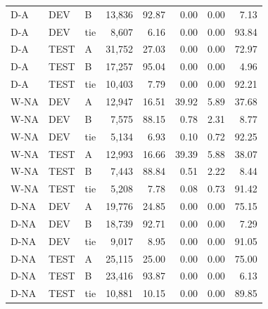 \begin{table}[htbp]
\begin{tabular}{lllrrrrr}
D-A & DEV & B & 13,836 & 92.87 & 0.00 & 0.00 & 7.13\\
D-A & DEV & tie & 8,607 & 6.16 & 0.00 & 0.00 & 93.84\\
D-A & TEST & A & 31,752 & 27.03 & 0.00 & 0.00 & 72.97\\
D-A & TEST & B & 17,257 & 95.04 & 0.00 & 0.00 & 4.96\\
D-A & TEST & tie & 10,403 & 7.79 & 0.00 & 0.00 & 92.21\\
W-NA & DEV & A & 12,947 & 16.51 & 39.92 & 5.89 & 37.68\\
W-NA & DEV & B & 7,575 & 88.15 & 0.78 & 2.31 & 8.77\\
W-NA & DEV & tie & 5,134 & 6.93 & 0.10 & 0.72 & 92.25\\
W-NA & TEST & A & 12,993 & 16.66 & 39.39 & 5.88 & 38.07\\
W-NA & TEST & B & 7,443 & 88.84 & 0.51 & 2.22 & 8.44\\
W-NA & TEST & tie & 5,208 & 7.78 & 0.08 & 0.73 & 91.42\\
D-NA & DEV & A & 19,776 & 24.85 & 0.00 & 0.00 & 75.15\\
D-NA & DEV & B & 18,739 & 92.71 & 0.00 & 0.00 & 7.29\\
D-NA & DEV & tie & 9,017 & 8.95 & 0.00 & 0.00 & 91.05\\
D-NA & TEST & A & 25,115 & 25.00 & 0.00 & 0.00 & 75.00\\
D-NA & TEST & B & 23,416 & 93.87 & 0.00 & 0.00 & 6.13\\
D-NA & TEST & tie & 10,881 & 10.15 & 0.00 & 0.00 & 89.85\\
\bottomrule
\end{tabular}
\end{table}

